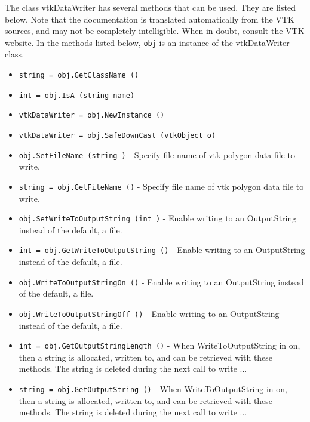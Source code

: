 The class vtkDataWriter has several methods that can be used.
  They are listed below.
Note that the documentation is translated automatically from the VTK sources,
and may not be completely intelligible.  When in doubt, consult the VTK website.
In the methods listed below, \verb|obj| is an instance of the vtkDataWriter class.
\begin{itemize}
\item  \verb|string = obj.GetClassName ()|

\item  \verb|int = obj.IsA (string name)|

\item  \verb|vtkDataWriter = obj.NewInstance ()|

\item  \verb|vtkDataWriter = obj.SafeDownCast (vtkObject o)|

\item  \verb|obj.SetFileName (string )| -  Specify file name of vtk polygon data file to write.

\item  \verb|string = obj.GetFileName ()| -  Specify file name of vtk polygon data file to write.

\item  \verb|obj.SetWriteToOutputString (int )| -  Enable writing to an OutputString instead of the default, a file.

\item  \verb|int = obj.GetWriteToOutputString ()| -  Enable writing to an OutputString instead of the default, a file.

\item  \verb|obj.WriteToOutputStringOn ()| -  Enable writing to an OutputString instead of the default, a file.

\item  \verb|obj.WriteToOutputStringOff ()| -  Enable writing to an OutputString instead of the default, a file.

\item  \verb|int = obj.GetOutputStringLength ()| -  When WriteToOutputString in on, then a string is allocated, written to,
 and can be retrieved with these methods.  The string is deleted during
 the next call to write ...

\item  \verb|string = obj.GetOutputString ()| -  When WriteToOutputString in on, then a string is allocated, written to,
 and can be retrieved with these methods.  The string is deleted during
 the next call to write ...


\end{itemize}
